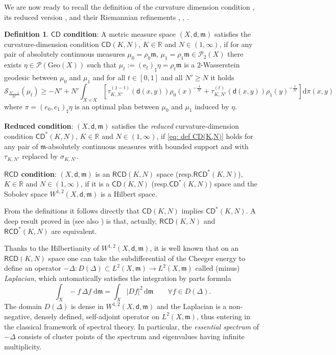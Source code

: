 \documentclass[12pt]{article}
\newcommand{\R}{\mathbb{R}}
\newcommand{\dd}{\mathrm{d}}
\newcommand{\ee}{\mathrm{e}}
\newcommand{\RCD}{\mathsf{RCD}}
\newcommand{\CD}{\mathsf{CD}}
\newcommand{\mm}{\mathfrak m}
\newcommand{\di}{\mathsf{d}}
\theoremstyle{plain}
\theoremstyle{definition}
\newtheorem{definition}[lemma]{Definition}
\begin{document}
We are now ready to recall the definition of the curvature dimension condition  \cite{St,St1,LottVillani-Annals2009},  its reduced version \cite{BS-JFA}, and their Riemannian refinements \cite{AGS1}, \cite{Gigli}, \cite{AGMR}.
\begin{definition}\label{def: CD(K,N)}
\textbf{$\CD$ condition}: A metric measure space $(X,\di,\mm)$ satisfies the curvature-dimension condition $\CD(K,N)$, $K\in \R$ and $N\in (1,\infty)$, if for any pair of absolutely continuous measures $\mu_0=\rho_0\mm$, $\mu_1=\rho_1\mm\in \mathcal{P}_2(X)$  there exists  $\eta\in \mathcal{P}(\mathrm{Geo}(X))$ such that $\mu_t:=(\ee_t)_{\sharp}\eta=\rho_t\mm$ is a $2$-Wasserstein geodesic between $\mu_0$ and $\mu_1$ and for all $t\in[0,1]$ and all $N'\ge N$ it holds
\begin{equation}\label{eq: def CD(K,N)}
{\mathcal S}_{\frac{N'-1}{N'}}(\mu_t)\geq -N' +N' \int_{X\times X}\left[\tau_{K,N'}^{(1-t)}(\di(x,y))\rho_0(x)^{-\frac{1}{N'}}+\tau_{K,N'}^{(t)}(\di(x,y))\rho_1(y)^{-\frac{1}{N'}}\right]\dd\pi(x,y)
\end{equation}
where $\pi=(e_0,e_1)_{\sharp}\eta$ is an optimal plan between $\mu_0$ and $\mu_1$ induced by $\eta$.
\smallskip

\textbf{Reduced condition}: $(X,\di,\mm)$ satisfies the \emph{reduced} curvature-dimension condition $\CD^*(K,N)$, $K\in \R$ and $N\in (1,\infty)$, if \eqref{eq: def CD(K,N)} holds for any pair of $\mm$-absolutely continuous measures with bounded support and with $\tau_{K,N'}$ replaced by $\sigma_{K,N'}$.

\textbf{$\RCD$ condition}: $(X,\di,\mm)$ is an $\RCD(K,N)$ space (resp.\;$\RCD^*(K,N)$), $K\in \R$ and $N\in (1,\infty)$, if it is a $\CD(K,N)$ (resp.\;$\CD^*(K,N)$) space and the Sobolev space $W^{1,2}(X,\di,\mm)$ is a Hilbert space.
\end{definition}

From the definitions it follows directly that $\CD(K,N)$ implies $\CD^*(K,N)$.  A deep result proved in \cite{CaMi} (see also \cite{Li-AMPA}) is that, actually,  $\RCD(K,N)$ and $\RCD^*(K,N)$ are equivalent.

Thanks to the Hilbertianity of $W^{1,2}(X,\di,\mm)$, it is well known that on an $\RCD(K,N)$ space one can take the subdifferential of the Cheeger energy to define an operator $-\Delta: D(\Delta)\subset L^2(X,\mm)\to L^2(X,\mm)$ called (minus) \emph{Laplacian}, which automatically satisfies the integration by parts formula
\[
\int_X -f\,\Delta f\; \dd\mm=\int_X|Df|^2\, \dd\mm \qquad \forall f\in D(\Delta).
\]
The domain $D(\Delta)$ is dense in $W^{1,2}(X,\di,\mm)$ and the Laplacian is a non-negative, densely defined, self-adjoint operator on $L^2(X,\mm)$, thus entering in the classical framework of spectral theory. In particular,  the \emph{essential spectrum} of $-\Delta$  consists of cluster points of the spectrum and eigenvalues having infinite multiplicity.
\end{document}
